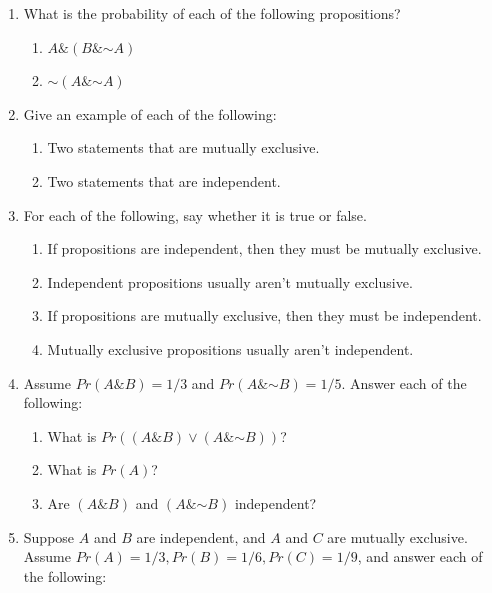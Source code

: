 \documentclass[justified]{tufte-book}
\providecommand{\tightlist}{%
  \setlength{\itemsep}{0pt}\setlength{\parskip}{0pt}}
\renewcommand{\neg}{\mathbin{\sim}}
\renewcommand{\wedge}{\mathbin{\&}}
\newcommand{\p}{Pr}
\theoremstyle{definition}
\theoremstyle{definition}
\theoremstyle{definition}
\theoremstyle{remark}
\begin{document}
\begin{enumerate}
\item
  What is the probability of each of the following propositions?

  \begin{enumerate}
  \def\labelenumii{\alph{enumii}.}
  \tightlist
  \item
    \(A \wedge (B \wedge \neg A)\)
  \item
    \(\neg (A \wedge \neg A)\)
  \end{enumerate}
\item
  Give an example of each of the following:

  \begin{enumerate}
  \def\labelenumii{\alph{enumii}.}
  \tightlist
  \item
    Two statements that are mutually exclusive.
  \item
    Two statements that are independent.
  \end{enumerate}
\item
  For each of the following, say whether it is true or false.

  \begin{enumerate}
  \def\labelenumii{\alph{enumii}.}
  \tightlist
  \item
    If propositions are independent, then they must be mutually
    exclusive.
  \item
    Independent propositions usually aren't mutually exclusive.
  \item
    If propositions are mutually exclusive, then they must be
    independent.
  \item
    Mutually exclusive propositions usually aren't independent.
  \end{enumerate}
\item
  Assume \(Pr(A \wedge B)=1/3\) and \(Pr(A \wedge \neg B)=1/5\). Answer
  each of the following:

  \begin{enumerate}
  \def\labelenumii{\alph{enumii}.}
  \tightlist
  \item
    What is \(Pr((A \wedge B) \vee (A \wedge \neg B))\)?
  \item
    What is \(Pr(A)\)?
  \item
    Are \((A \wedge B)\) and \((A \wedge \neg B)\) independent?
  \end{enumerate}
\item
  Suppose \(A\) and \(B\) are independent, and \(A\) and \(C\) are
  mutually exclusive. Assume \(\p(A) = 1/3, \p(B) = 1/6, \p(C) = 1/9\),
  and answer each of the following:


\end{enumerate}
\end{document}
